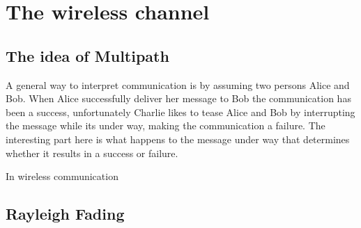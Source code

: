 




\chapter{The wireless channel}




\section{The idea of Multipath}
A general way to interpret communication is by assuming two persons Alice and Bob. When Alice successfully deliver her message to Bob the communication has been a success, unfortunately Charlie likes to tease Alice and Bob by interrupting the message while its under way, making the communication a failure. The interesting part here is what happens to the message under way that determines whether it results in a success or failure. 

In wireless communication 

\section{Rayleigh Fading}


